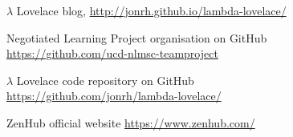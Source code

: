 \documentclass{article}
\begin{document}
\vspace{0.5em}

\begin{thebibliography}{9} 

	$\lambda$ Lovelace blog, \url{http://jonrh.github.io/lambda-lovelace/}
	
	Negotiated Learning Project organisation on GitHub \\
	\url{https://github.com/ucd-nlmsc-teamproject}

	$\lambda$ Lovelace code repository on GitHub \\
	\url{https://github.com/jonrh/lambda-lovelace/}
	
	ZenHub official website \url{https://www.zenhub.com/}


\end{thebibliography}
\end{document}
